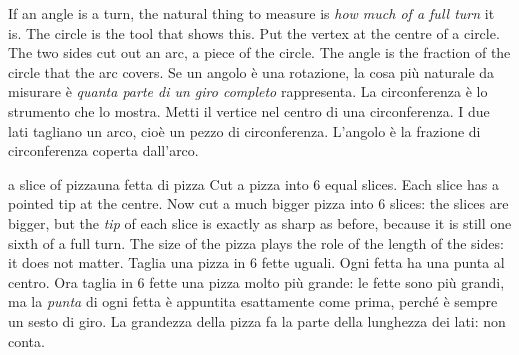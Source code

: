 \label{sec:circle}
\begin{bi}
If an angle is a turn, the natural thing to measure is \emph{how much of a full turn} it is. The circle is the tool that shows this. Put the vertex at the centre of a circle. The two sides cut out an arc, a piece of the circle. The angle is the fraction of the circle that the arc covers.
\IT
Se un angolo è una rotazione, la cosa più naturale da misurare è \emph{quanta parte di un giro completo} rappresenta. La circonferenza è lo strumento che lo mostra. Metti il vertice nel centro di una circonferenza. I due lati tagliano un arco, cioè un pezzo di circonferenza. L'angolo è la frazione di circonferenza coperta dall'arco.
\end{bi}

\begin{anchor}{a slice of pizza}{una fetta di pizza}
Cut a pizza into 6 equal slices. Each slice has a pointed tip at the centre. Now cut a much bigger pizza into 6 slices: the slices are bigger, but the \emph{tip} of each slice is exactly as sharp as before, because it is still one sixth of a full turn. The size of the pizza plays the role of the length of the sides: it does not matter.
\tcblower
Taglia una pizza in 6 fette uguali. Ogni fetta ha una punta al centro. Ora taglia in 6 fette una pizza molto più grande: le fette sono più grandi, ma la \emph{punta} di ogni fetta è appuntita esattamente come prima, perché è sempre un sesto di giro. La grandezza della pizza fa la parte della lunghezza dei lati: non conta.
\end{anchor}


